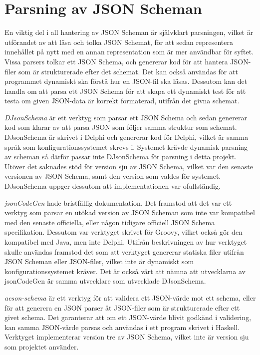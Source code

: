 \section{Parsning av JSON Scheman}

En viktig del i all hantering av JSON Scheman är självklart parsningen, vilket är utförandet av att läsa och tolka JSON Schemat, för att sedan representera innehållet på nytt med en annan representation som är mer användbar för syftet. Vissa parsers tolkar ett JSON Schema, och genererar kod för att hantera JSON-filer som är strukturerade efter det schemat. Det kan också användas för att programmet dynamiskt ska förstå hur en JSON-fil ska läsas. Dessutom kan det handla om att parsa ett JSON Schema för att skapa ett dynamiskt test för att testa om given JSON-data är korrekt formaterad, utifrån det givna schemat.

\textit{DJsonSchema} är ett verktyg som parsar ett JSON Schema och sedan genererar kod som klarar av att parsa JSON som följer samma struktur som schemat. DJsonSchema är skrivet i Delphi och genererar kod för Delphi, vilket är samma språk som konfigurationssystemet skrevs i. Systemet krävde dynamisk parsning av scheman så därför passar inte DJsonSchema för parsning i detta projekt. Utöver det saknades stöd för version sju av JSON Schema, vilket var den senaste versionen av JSON Schema, samt den version som valdes för systemet. DJsonSchema uppger dessutom att implementationen var ofullständig. \cite{Schlothauer&WauerGmbH}

\textit{jsonCodeGen} hade bristfällig dokumentation. Det framstod att det var ett verktyg som parsar en utökad version av JSON Scheman som inte var kompatibel med den senaste officiella, eller någon tidigare officiell JSON Schema specifikation. Dessutom var verktyget skrivet för Groovy, vilket också gör den kompatibel med Java, men inte Delphi. Utifrån beskrivningen av hur verktyget skulle användas framstod det som att verktyget genererar statiska filer utifrån JSON Scheman eller JSON-filer, vilket inte är dynamiskt som konfigurationssystemet kräver. Det är också värt att nämna att utvecklarna av jsonCodeGen är samma utvecklare som utvecklade DJsonSchema. \cite{Schlothauer&WauerGmbHa} 

\textit{aeson-schema} är ett verktyg för att validera ett JSON-värde mot ett schema, eller för att generera en JSON parser åt JSON-filer som är strukturerade efter ett givet schema. Det garanterar att om ett JSON-värde blivit godkänd i validering, kan samma JSON-värde parsas och användas i ett program skrivet i Haskell. Verktyget implementerar version tre av JSON Schema, vilket inte är version sju som projektet använder. \cite{Kowalczyk}

